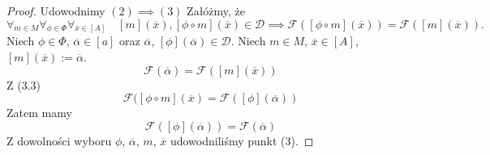 \documentclass[12pt,a4paper]{report}
\newcommand{\domkniecie}[1]{\left[ {#1} \right] }
\begin{document}
\begin{proof}
Udowodnimy $(2) \implies (3)$
Załóżmy, że
\begin{equation}
\forall_{m \in M}\forall_{\phi \in \Phi} \forall_{\overline{x} \in \domkniecie{A}} \quad \domkniecie{m}(\overline{x}),\domkniecie{\phi\circ m}(\overline{x}) \in \mathcal{D} \implies \mathcal{F}( \domkniecie{\phi \circ m}(\overline{x}))=\mathcal{F}(\domkniecie{m}(\overline{x})).
\end{equation}
Niech $\phi \in \Phi$, $\overline{\alpha} \in \domkniecie{a}$ oraz $\overline{\alpha}$, $\domkniecie{\phi}(\overline{\alpha})\in \mathcal{D}$. Niech $m \in M$, $\overline{x} \in \domkniecie{A}$, $\domkniecie{m}(\overline{x}):= \overline{\alpha}$. 
$$
 \mathcal{F}(\overline{\alpha})=\mathcal{F}(\domkniecie{m}(\overline{x}))
$$
Z (3.3)
$$
\mathcal{F}(\domkniecie{\phi \circ m}(\overline{x})=\mathcal{F}(\domkniecie{\phi}(\overline{\alpha}))
$$
Zatem mamy
$$
\mathcal{F}(\domkniecie{\phi}(\overline{\alpha}))=\mathcal{F}(\overline{\alpha})
$$
Z dowolności wyboru $\phi$, $\overline{\alpha}$, $m$, $\overline{x}$ udowodniliśmy punkt (3).
\end{proof}
\end{document}
